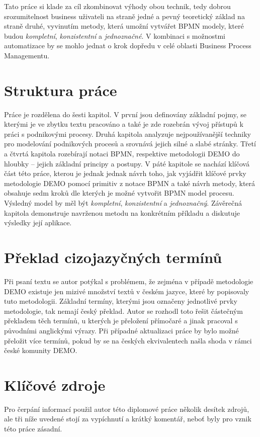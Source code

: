 Tato práce si klade za cíl zkombinovat výhody obou technik, tedy dobrou srozumitelnost business uživateli na straně jedné a pevný teoretický základ na straně druhé, vyvinutím metody, která umožní vytvářet BPMN modely, které budou \textit{kompletní}, \textit{konzistentní} a \textit{jednoznačné}. V kombinaci s možnostmi automatizace by se mohlo jednat o krok dopředu v celé oblasti Business Process Managementu.

\section{Struktura práce}
Práce je rozdělena do šesti kapitol. V první jsou definovány základní pojmy, se kterými je ve zbytku textu pracováno a také je zde rozebrán vývoj přístupů k práci s podnikovými procesy. Druhá kapitola analyzuje nejpoužívanější techniky pro modelování podnikových procesů a srovnává jejich silné a slabé stránky. Třetí a čtvrtá kapitola rozebírají notaci BPMN, respektive metodologii DEMO do hloubky – jejich základní principy a postupy. V páté kapitole se nachází klíčová část této práce, kterou je jednak jednak návrh toho, jak vyjádřit klíčové prvky metodologie DEMO pomocí primitiv z notace BPMN a také návrh metody, která obsahuje sedm kroků dle kterých je možné vytvořit BPMN model procesu. Výsledný model by měl být \textit{kompletní}, \textit{konzistentní} a \textit{jednoznačný}. Závěrečná kapitola demonstruje navrženou metodu na konkrétním příkladu a diskutuje výsledky její aplikace.

\section{Překlad cizojazyčných termínů}
Při psaní textu se autor potýkal s problémem, že zejména v případě metodologie DEMO existuje jen mizivé množství textů v českém jazyce, které by popisovaly tuto metodologii. Základní termíny, kterými jsou označeny jednotlivé prvky metodologie, tak nemají český překlad. Autor se rozhodl toto řešit částečným překladem těch termínů, u kterých je přeložení přímočaré a jinak pracoval s původními anglickými výrazy. Při případné aktualizaci práce by bylo možné přeložit více termínů, pokud by se na českých ekvivalentech našla shoda v rámci české komunity DEMO.

\section{Klíčové zdroje}
Pro čerpání informací použil autor této diplomové práce několik desítek zdrojů, ale tři níže uvedené stojí za vypíchnutí a krátký komentář, neboť byly pro vznik této práce zásadní.

